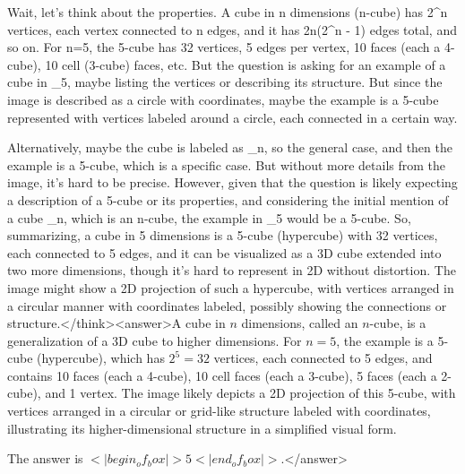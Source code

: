 Wait, let's think about the properties. A cube in n dimensions (n-cube) has 2^n vertices, each vertex connected to n edges, and it has 2n(2^n - 1) edges total, and so on. For n=5, the 5-cube has 32 vertices, 5 edges per vertex, 10 faces (each a 4-cube), 10 cell (3-cube) faces, etc. But the question is asking for an example of a cube in _5, maybe listing the vertices or describing its structure. But since the image is described as a circle with coordinates, maybe the example is a 5-cube represented with vertices labeled around a circle, each connected in a certain way. 

Alternatively, maybe the cube is labeled as _n, so the general case, and then the example is a 5-cube, which is a specific case. But without more details from the image, it's hard to be precise. However, given that the question is likely expecting a description of a 5-cube or its properties, and considering the initial mention of a cube _n, which is an n-cube, the example in _5 would be a 5-cube. So, summarizing, a cube in 5 dimensions is a 5-cube (hypercube) with 32 vertices, each connected to 5 edges, and it can be visualized as a 3D cube extended into two more dimensions, though it's hard to represent in 2D without distortion. The image might show a 2D projection of such a hypercube, with vertices arranged in a circular manner with coordinates labeled, possibly showing the connections or structure.</think><answer>A cube in \( n \) dimensions, called an \( n \)-cube, is a generalization of a 3D cube to higher dimensions. For \( n = 5 \), the example is a 5-cube (hypercube), which has \( 2^5 = 32 \) vertices, each connected to 5 edges, and contains 10 faces (each a 4-cube), 10 cell faces (each a 3-cube), 5 faces (each a 2-cube), and 1 vertex. The image likely depicts a 2D projection of this 5-cube, with vertices arranged in a circular or grid-like structure labeled with coordinates, illustrating its higher-dimensional structure in a simplified visual form.  

The answer is \(<|begin_of_box|>5<|end_of_box|>\).</answer>